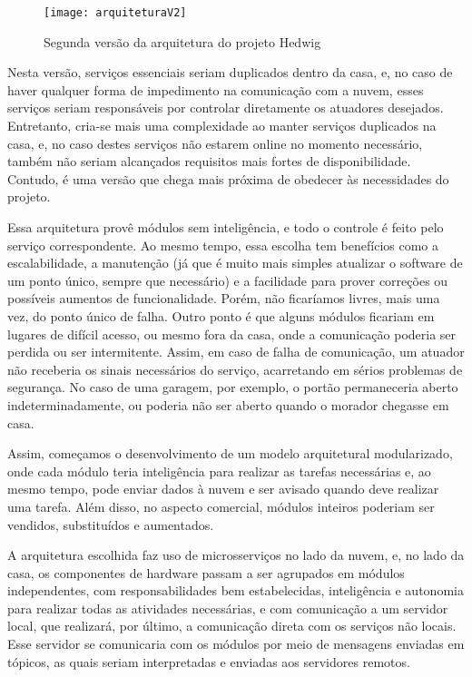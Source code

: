 \begin{figure}[H]
	\centering
	\caption{Segunda versão da arquitetura do projeto Hedwig}
  \texttt{[image: arquiteturaV2]}
\label{fig:arquiteturaV2}
\end{figure}

Nesta versão, serviços essenciais seriam duplicados dentro da casa, e, no caso de haver qualquer forma de impedimento na comunicação com a nuvem, esses serviços seriam responsáveis por controlar diretamente os atuadores desejados. Entretanto, cria-se mais uma complexidade ao manter serviços duplicados na casa, e, no caso destes serviços não estarem online no momento necessário, também não seriam alcançados requisitos mais fortes de disponibilidade. Contudo, é uma versão que chega mais próxima de obedecer às necessidades do projeto.

Essa arquitetura provê módulos sem inteligência, e todo o controle é feito pelo serviço correspondente. Ao mesmo tempo, essa escolha tem benefícios como a escalabilidade, a manutenção (já que é muito mais simples atualizar o software de um ponto único, sempre que necessário) e a facilidade para prover correções ou possíveis aumentos de funcionalidade. Porém, não ficaríamos livres, mais uma vez, do ponto único de falha. Outro ponto é que alguns módulos ficariam em lugares de difícil acesso, ou mesmo fora da casa, onde a comunicação poderia ser perdida ou ser intermitente. Assim, em caso de falha de comunicação, um atuador não receberia os sinais necessários do serviço, acarretando em sérios problemas de segurança. No caso de uma garagem, por exemplo, o portão permaneceria aberto indeterminadamente, ou poderia não ser aberto quando o morador chegasse em casa.

Assim, começamos o desenvolvimento de um modelo arquitetural modularizado, onde cada módulo teria inteligência para realizar as tarefas necessárias e, ao mesmo tempo, pode enviar dados à nuvem e ser avisado quando deve realizar uma tarefa. Além disso, no aspecto comercial, módulos inteiros poderiam ser vendidos, substituídos e aumentados.

A arquitetura escolhida faz uso de microsserviços no lado da nuvem, e, no lado da casa, os componentes de hardware passam a ser agrupados em módulos independentes, com responsabilidades bem estabelecidas, inteligência e autonomia para realizar todas as atividades necessárias, e com comunicação a um servidor local, que realizará, por último, a comunicação direta com os serviços não locais. Esse servidor se comunicaria com os módulos por meio de mensagens enviadas em tópicos, as quais seriam interpretadas e enviadas aos servidores remotos.

